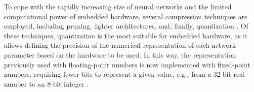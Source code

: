 
{To cope with the rapidly increasing size of neural networks and the limited computational power of embedded hardware, several compression techniques are employed, including pruning, lighter architectures, and, finally, quantization \cite{dantasComprehensiveReviewModel2024}. Of these techniques, quantization is the most suitable for embedded hardware, as it allows defining the precision of the numerical representation of each network parameter based on the hardware to be used. In this way, the representation previously used with floating-point numbers is now implemented with fixed-point numbers, requiring fewer bits to represent a given value, e.g., from a 32-bit real number to an 8-bit integer \cite{abdi2021counterexample}.}




